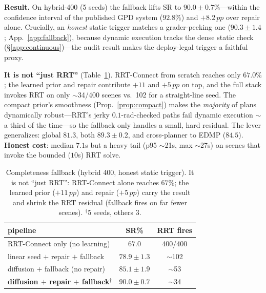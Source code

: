 \documentclass[10pt,twocolumn]{article}
\newcommand{\pp}{\,pp}
\begin{document}
\noindent\textbf{Result.} On hybrid-400 (5 seeds) the fallback lifts SR to
$\mathbf{90.0{\pm}0.7\%}$---within the confidence interval of the published GPD system
($92.8\%$) and $+8.2\pp$ over repair alone. Crucially, an \emph{honest} static trigger
matches a grader-peeking one ($90.3{\pm}1.4$; App.~\ref{app:fallback}), because dynamic
execution tracks the dense static check (\S\ref{app:continuous})---the audit result makes
the deploy-legal trigger a faithful proxy.

\noindent\textbf{It is not ``just RRT''} (Table~\ref{tab:fallback}). RRT-Connect from
scratch reaches only $67.0\%$; the learned prior and repair contribute $+11$ and $+5\pp$
on top, and the full stack invokes RRT on only $\sim$34/400 scenes vs.\ 102 for a
straight-line seed. The compact prior's smoothness (Prop.~\ref{prop:compact}) makes the
\emph{majority} of plans dynamically robust---RRT's jerky $0.1$-rad-checked paths fail
dynamic execution $\sim$a third of the time---so the fallback only handles a small, hard
residual. The lever generalizes: global $81.3$, both $89.3{\pm}0.2$, and cross-planner to
EDMP ($84.5$). \textbf{Honest cost}: median $7.1$s but a heavy tail (p95 $\sim$21s, max
$\sim$27s) on scenes that invoke the bounded ($10$s) RRT solve.

\begin{table}[t]\centering\small
\caption{Completeness fallback (hybrid 400, honest static trigger). It is not ``just
RRT'': RRT-Connect alone reaches $67\%$; the learned prior ($+11\pp$) and repair
($+5\pp$) carry the result and shrink the RRT residual (fallback fires on far fewer
scenes). $^{\dagger}$5 seeds, others 3.}
\label{tab:fallback}
\begin{tabular}{lcc}
\toprule
pipeline & SR\% & RRT fires \\
\midrule
RRT-Connect only (no learning)     & $67.0$ & 400/400 \\
linear seed $+$ repair $+$ fallback & $78.9{\pm}1.3$ & $\sim$102 \\
diffusion $+$ fallback (no repair)  & $85.1{\pm}1.9$ & $\sim$53 \\
\textbf{diffusion $+$ repair $+$ fallback}$^{\dagger}$ & $\mathbf{90.0{\pm}0.7}$ & $\sim$34 \\
\bottomrule
\end{tabular}
\end{table}
\end{document}
